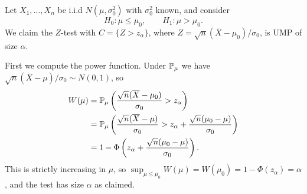 \documentclass[a4paper]{scrartcl}
\begin{document}
\begin{example}
  Let $X_1, \dots, X_n$ be i.i.d $N(\mu, \sigma_0^2)$ with $\sigma_0^2$ known, and consider
  $$
  H_0 : \mu \leq \mu_0, \qquad H_1 : \mu > \mu_0.
  $$
  We claim the $Z$-test with $C = \{Z > z_\alpha\}$, where $Z = \sqrt{n}(\overline{X}-\mu_0)/\sigma_0$, is UMP of size $\alpha$.

  First we compute the power function. Under $\mathbb{P}_\mu$ we have $\sqrt{n}(\overline{X}-\mu)/\sigma_0 \sim N(0,1)$, so
  \begin{align*}
    W(\mu) &= \mathbb{P}_\mu\left(\frac{\sqrt{n}(\overline{X}-\mu_0)}{\sigma_0} > z_\alpha\right)\\
    &= \mathbb{P}_\mu\left(\frac{\sqrt{n}(\overline{X}-\mu)}{\sigma_0} > z_\alpha + \frac{\sqrt{n}(\mu_0 - \mu)}{\sigma_0}\right)\\
    &= 1 - \Phi\left(z_\alpha + \frac{\sqrt{n}(\mu_0-\mu)}{\sigma_0}\right).
  \end{align*}
  This is strictly increasing in $\mu$, so $\sup_{\mu\leq\mu_0}W(\mu) = W(\mu_0) = 1 - \Phi(z_\alpha) = \alpha$, and the test has size $\alpha$ as claimed.


\end{example}
\end{document}
